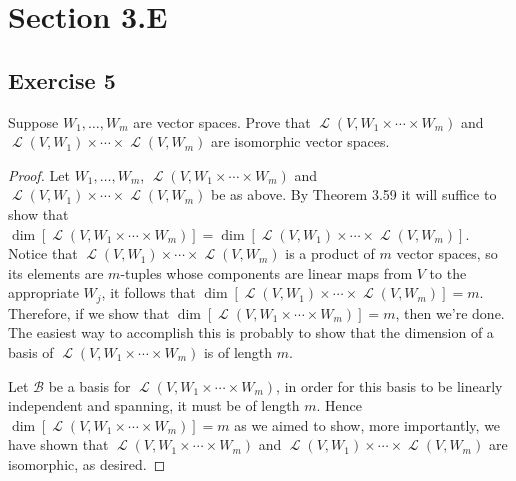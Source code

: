 \documentclass[letterpaper, 12pt]{amsart}
\DeclareMathOperator{\Ell}{\mathscr{L}}
\theoremstyle{definition}  %
\begin{document}
	\section*{Section 3.E}
		\subsection*{Exercise 5}
		Suppose $W_{1}, \dots, W_{m}$ are vector spaces. 
		Prove that $\Ell(V, W_{1} \times \cdots \times W_{m})$ and $\Ell(V,W_{1}) \times \cdots \times \Ell(V,W_{m})$ are isomorphic vector spaces.
		
		\begin{proof}
		Let $W_{1}, \dots, W_{m}$, $\Ell(V, W_{1} \times \cdots \times W_{m})$ and $\Ell(V,W_{1}) \times \cdots \times \Ell(V,W_{m})$ be as above.
		By Theorem 3.59 it will suffice to show that $\dim{[\Ell(V, W_{1} \times \cdots \times W_{m})]} = \dim{[\Ell(V,W_{1}) \times \cdots \times \Ell(V,W_{m})]}$.
		Notice that $\Ell(V,W_{1}) \times \cdots \times \Ell(V,W_{m})$ is a product of $m$ vector spaces, so its elements are $m$-tuples whose components are linear maps from $V$ to the appropriate $W_{j}$, it follows that $\dim{[\Ell(V,W_{1}) \times \cdots \times \Ell(V,W_{m})]} = m$.
		Therefore, if we show that $\dim{[\Ell(V, W_{1} \times \cdots \times W_{m})]} = m$, then we're done.
		The easiest way to accomplish this is probably to show that the dimension of a basis of $\Ell(V, W_{1} \times \cdots \times W_{m})$ is of length $m$.

		Let $\mathcal{B}$ be a basis for $\Ell(V,W_{1} \times \cdots \times W_{m})$, in order for this basis to be linearly independent and spanning, it must be of length $m$.
		Hence $\dim{[\Ell(V,W_{1} \times \cdots \times W_{m})]} = m$ as we aimed to show, more importantly, we have shown that $\Ell(V, W_{1} \times \cdots \times W_{m})$ and $\Ell(V,W_{1}) \times \cdots \times \Ell(V,W_{m})$ are isomorphic, as desired.
		\end{proof}
\end{document}

